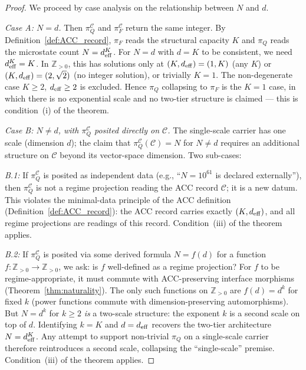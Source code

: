 \documentclass[11pt]{article}
\theoremstyle{plain}
\theoremstyle{definition}
\theoremstyle{remark}
\begin{document}
\begin{proof}
We proceed by case analysis on the relationship between $N$ and $d$.

\medskip

\emph{Case A: $N = d$.}  Then $\pi_Q^{\mathcal{C}}$ and $\pi_F^{\mathcal{C}}$ return the same integer.  By Definition~\ref{def:ACC_record}, $\pi_F$ reads the structural capacity $K$ and $\pi_Q$ reads the microstate count $N = d_{\rm eff}^K$.  For $N = d$ with $d = K$ to be consistent, we need $d_{\rm eff}^K = K$.  In $\mathbb{Z}_{>0}$, this has solutions only at $(K, d_{\rm eff}) = (1, K)$ (any $K$) or $(K, d_{\rm eff}) = (2, \sqrt{2})$ (no integer solution), or trivially $K = 1$.  The non-degenerate case $K \geq 2$, $d_{\rm eff} \geq 2$ is excluded.  Hence $\pi_Q$ collapsing to $\pi_F$ is the $K = 1$ case, in which there is no exponential scale and no two-tier structure is claimed --- this is condition~(i) of the theorem.

\medskip

\emph{Case B: $N \neq d$, with $\pi_Q^{\mathcal{C}}$ posited directly on $\mathcal{C}$.}  The single-scale carrier has one scale (dimension $d$); the claim that $\pi_Q^{\mathcal{C}}(\mathcal{C}) = N$ for $N \neq d$ requires an additional structure on $\mathcal{C}$ beyond its vector-space dimension.  Two sub-cases:

\emph{B.1:} If $\pi_Q^{\mathcal{C}}$ is posited as independent data (e.g., ``$N = 10^{61}$ is declared externally''), then $\pi_Q^{\mathcal{C}}$ is not a regime projection reading the ACC record $\mathcal{C}$; it is a new datum.  This violates the minimal-data principle of the ACC definition (Definition~\ref{def:ACC_record}): the ACC record carries exactly $(K, d_{\rm eff})$, and all regime projections are readings of this record.  Condition~(iii) of the theorem applies.

\emph{B.2:} If $\pi_Q^{\mathcal{C}}$ is posited via some derived formula $N = f(d)$ for a function $f : \mathbb{Z}_{>0} \to \mathbb{Z}_{>0}$, we ask: is $f$ well-defined as a regime projection?  For $f$ to be regime-appropriate, it must commute with ACC-preserving interface morphisms (Theorem~\ref{thm:naturality}).  The only such functions on $\mathbb{Z}_{>0}$ are $f(d) = d^k$ for fixed $k$ (power functions commute with dimension-preserving automorphisms).  But $N = d^k$ for $k \geq 2$ \emph{is} a two-scale structure: the exponent $k$ is a second scale on top of $d$.  Identifying $k = K$ and $d = d_{\rm eff}$ recovers the two-tier architecture $N = d_{\rm eff}^K$.  Any attempt to support non-trivial $\pi_Q$ on a single-scale carrier therefore reintroduces a second scale, collapsing the ``single-scale'' premise.  Condition~(iii) of the theorem applies.


\end{proof}
\end{document}
